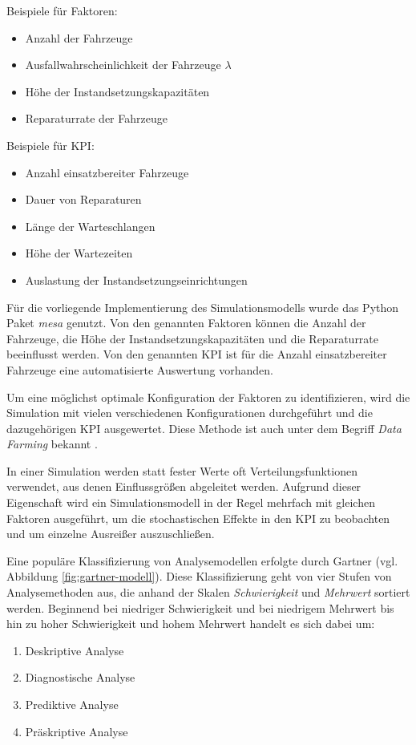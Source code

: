\documentclass[11pt,a4paper]{article}
\begin{document}
Beispiele für Faktoren:
\begin{itemize}
	\item Anzahl der Fahrzeuge
	\item Ausfallwahrscheinlichkeit der Fahrzeuge $\lambda$
	\item Höhe der Instandsetzungskapazitäten
	\item Reparaturrate der Fahrzeuge
\end{itemize}
Beispiele für KPI:
\begin{itemize}
	\item Anzahl einsatzbereiter Fahrzeuge
	\item Dauer von Reparaturen
	\item Länge der Warteschlangen
	\item Höhe der Wartezeiten
	\item Auslastung der Instandsetzungseinrichtungen
\end{itemize}

Für die vorliegende Implementierung des Simulationsmodells wurde das Python Paket \emph{mesa} \cite{python-mesa-2020} genutzt.
Von den genannten Faktoren können die Anzahl der Fahrzeuge, die Höhe der Instandsetzungskapazitäten und die
Reparaturrate beeinflusst werden. Von den genannten KPI ist für die Anzahl einsatzbereiter Fahrzeuge
eine automatisierte Auswertung vorhanden.

Um eine möglichst optimale Konfiguration der Faktoren zu identifizieren, wird die Simulation 
mit vielen verschiedenen Konfigurationen durchgeführt und die dazugehörigen KPI ausgewertet.
Diese Methode ist auch unter dem Begriff \emph{Data Farming} bekannt \cite{8632383}.

In einer Simulation werden statt fester Werte oft Verteilungsfunktionen verwendet, aus denen Einflussgrößen abgeleitet werden. 
Aufgrund dieser Eigenschaft wird ein Simulationsmodell in der Regel mehrfach
mit gleichen Faktoren ausgeführt, um die stochastischen Effekte in den KPI zu beobachten und
um einzelne Ausreißer auszuschließen. 

Eine populäre Klassifizierung von Analysemodellen erfolgte durch Gartner \cite{Gartner} (vgl. Abbildung \ref{fig:gartner-modell}).
Diese Klassifizierung geht von vier Stufen von Analysemethoden aus, die anhand der Skalen \emph{Schwierigkeit} und \emph{Mehrwert} sortiert werden.
Beginnend bei niedriger Schwierigkeit und bei niedrigem Mehrwert bis hin zu hoher Schwierigkeit und hohem Mehrwert
handelt es sich dabei um:
\begin{enumerate}
	\item Deskriptive Analyse
	\item Diagnostische Analyse
	\item Prediktive Analyse
	\item Präskriptive Analyse
\end{enumerate}
\end{document}
